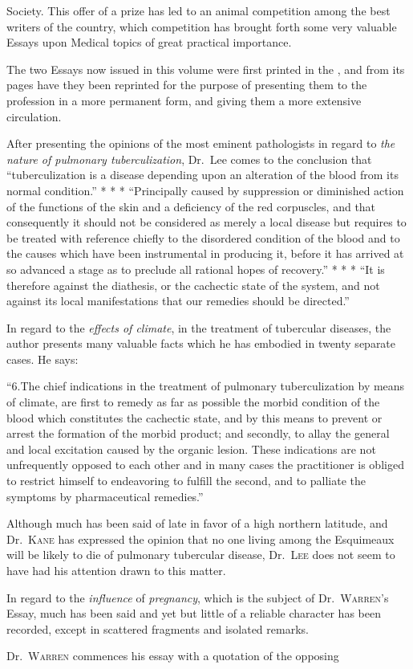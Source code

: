 Society. This offer of a prize has led to an animal competition among
the best writers of the country, which competition has brought forth
some very valuable Essays upon Medical topics of great practical importance.

The two Essays now issued in this volume were first printed in the
, and from its pages have they
been reprinted for the purpose of presenting them to the profession in
a more permanent form, and giving them a more extensive circulation.

After presenting the opinions of the most eminent pathologists in
regard to \emph{the nature of pulmonary tuberculization}, Dr.~Lee comes to
the conclusion that ``tuberculization is a disease depending upon an
alteration of the blood from its normal condition.'' * * * ``Principally
caused by suppression or diminished action of the functions of the
skin and a deficiency of the red corpuscles, and that consequently it
should not be considered as merely a local disease but requires to be
treated with reference chiefly to the disordered condition of the blood
and to the causes which have been instrumental in producing it, before
it has arrived at so advanced a stage as to preclude all rational hopes
of recovery.'' * * * ``It is therefore against the diathesis, or the
cachectic state of the system, and not against its local manifestations
that our remedies should be directed.''

In regard to the \emph{effects of climate}, in the treatment of tubercular
diseases, the author presents many valuable facts which he has embodied
in twenty separate cases. He says:

``6.\quad{}The chief indications in the treatment of pulmonary tuberculization
by means of climate, are first to remedy as far as possible the
morbid condition of the blood which constitutes the cachectic state, and
by this means to prevent or arrest the formation of the morbid product;
and secondly, to allay the general and local excitation caused by
the organic lesion. These indications are not unfrequently opposed to
each other and in many cases the practitioner is obliged to restrict himself
to endeavoring to fulfill the second, and to palliate the symptoms
by pharmaceutical remedies.''

Although much has been said of late in favor of a high northern
latitude, and Dr.~\textsc{Kane} has expressed the opinion that no one living
among the Esquimeaux will be likely to die of pulmonary tubercular
disease, Dr.~\textsc{Lee} does not seem to have had his attention drawn to this
matter.

In regard to the \emph{influence} of \emph{pregnancy}, which is the subject of Dr.~\textsc{Warren}'s
Essay, much has been said and yet but little of a reliable character
has been recorded, except in scattered fragments and isolated remarks.

Dr.~\textsc{Warren} commences his essay with a quotation of the opposing\endinput
